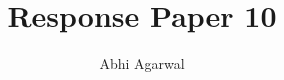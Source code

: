 \documentclass[11pt, oneside]{article}
\title{Response Paper 10}
\author{Abhi Agarwal}
\date{}
\begin{document}
\maketitle

\par 
\end{document}
